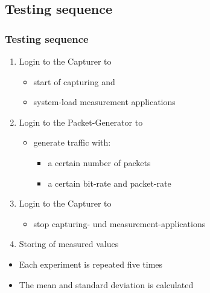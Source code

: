 \documentclass{beamer}
\begin{document}
\subsection*{Testing sequence}
\begin{frame}
\frametitle{Testing sequence}
\begin{enumerate}
	\item Login to the Capturer to 
		\begin{itemize}
			\item start of capturing and 
			\item system-load measurement applications 
		\end{itemize}
	\item Login to the Packet-Generator to 

	\begin{itemize}
		\item generate traffic with:
				\begin{itemize}
					\item a certain number of packets
					\item a certain bit-rate and packet-rate
				\end{itemize}
	\end{itemize}

	\item Login to the Capturer to 
		\begin{itemize}
			\item stop capturing- und measurement-applications
		\end{itemize}
	\item Storing of measured values
\end{enumerate}
\begin{itemize}
	\item Each experiment is repeated five times
	\item The mean and standard deviation is calculated
\end{itemize}
\end{frame}
\end{document}

